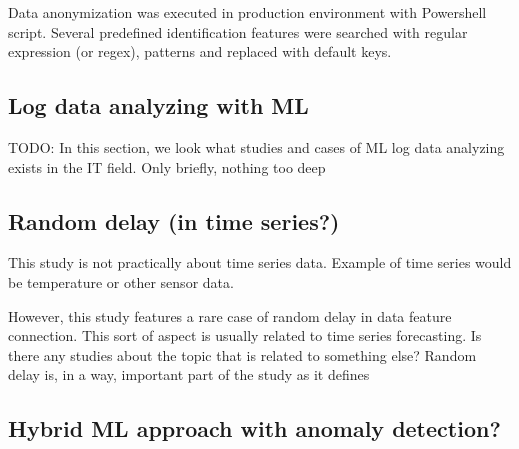 Data anonymization was executed in production environment
with Powershell script.
Several predefined identification features were searched with
regular expression (or regex), patterns and replaced with
default keys.


\subsection{Log data analyzing with ML}\label{subsec:bg-log-data-analyzing-with-ml}
TODO: In this section, we look what studies and cases of ML log data analyzing
exists in the IT field.
Only briefly, nothing too deep



\clearpage
{}

\subsection{Random delay (in time series?)}\label{subsec:bg-random-delay-in-time-series}

\begin{itcomment}
    This study is not practically about time series data.
    Example of time series would be temperature or other sensor data.

    However, this study features a rare case of random delay in data feature connection.
    This sort of aspect is usually related to time series forecasting.
    Is there any studies about the topic that is related to something else?
    Random delay is, in a way, important part of the study as it defines
\end{itcomment}

\subsection{Hybrid ML approach with anomaly detection?}\label{subsec:bg-hybrid-ml-approach-with-anomaly-detection}


